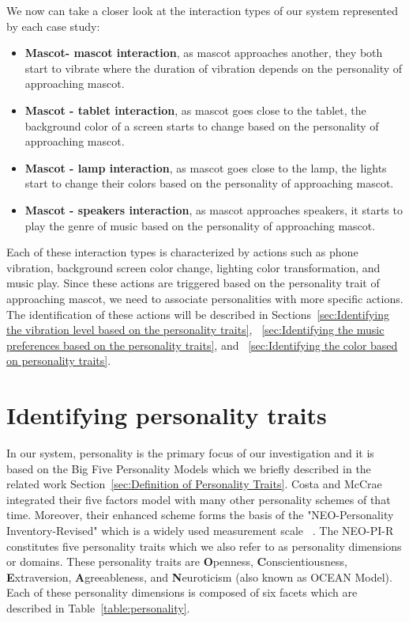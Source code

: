 We now can take a closer look at the interaction types of our system represented by each case study:
\begin{itemize}
    \item \textbf{Mascot- mascot interaction}, as mascot approaches another,
    they both start to vibrate where the duration of vibration depends on the personality of approaching mascot.
    \item \textbf{Mascot - tablet interaction}, as mascot goes close to the tablet, the background
    color of a screen starts to change based on the personality of approaching mascot.
    \item \textbf{Mascot - lamp interaction}, as mascot goes close to the lamp,
    the lights start to change their colors based on the personality of approaching mascot.
    \item \textbf{Mascot - speakers interaction}, as mascot approaches speakers,
    it starts to play the genre of music based on the personality of approaching mascot.
\end{itemize}

Each of these interaction types is characterized by actions such as phone vibration,
background screen color change, lighting color transformation, and music play.
Since these actions are triggered based on the personality trait of approaching mascot,
we need to associate personalities with more specific actions.
The identification of these actions will be described in
Sections~\ref{sec:Identifying the vibration level based on the personality traits},
~\ref{sec:Identifying the music preferences based on the personality traits},
and ~\ref{sec:Identifying the color based on personality traits}.

\section{Identifying personality traits}
\label{sec:Identifying personality traits}

In our system, personality is the primary focus of our investigation and
it is based on the Big Five Personality Models which we briefly described
in the related work Section~\ref{sec:Definition of Personality Traits}.
Costa and McCrae integrated their five factors model with many other personality schemes of that time.
Moreover, their enhanced scheme forms the basis of the "NEO-Personality Inventory-Revised"
which is a widely used measurement scale ~\cite{costa2008revised}.
The NEO-PI-R constitutes five personality traits which we also refer to as personality dimensions or domains.
These personality traits are \textbf{O}penness, \textbf{C}onscientiousness,
\textbf{E}xtraversion, \textbf{A}greeableness, and \textbf{N}euroticism (also known as OCEAN Model).
Each of these personality dimensions is composed of six facets which are described in Table~\ref{table:personality}.

